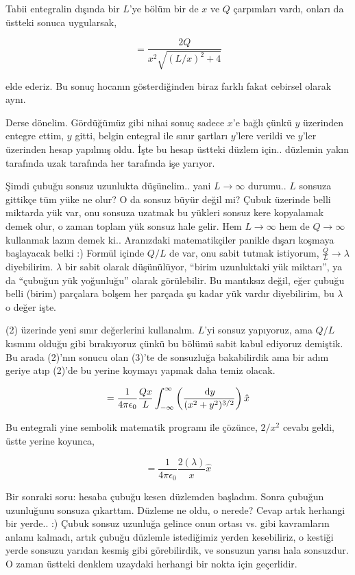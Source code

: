 \documentclass[12pt,fleqn]{article}\usepackage{../../common}
\begin{document}
Tabii entegralin dışında bir $L$'ye bölüm bir de $x$ ve $Q$ çarpımları
vardı, onları da üstteki sonuca uygularsak,

$$ 
= \frac{2 Q}{x^2 \sqrt{(L/x)^2 + 4}  }
$$

elde ederiz. Bu sonuç hocanın gösterdiğinden biraz farklı fakat cebirsel
olarak aynı. 

Derse dönelim. Gördüğümüz gibi nihai sonuç sadece $x$'e bağlı çünkü $y$
üzerinden entegre ettim, $y$ gitti, belgin entegral ile sınır şartları
$y$'lere verildi ve $y$'ler üzerinden hesap yapılmış oldu. İşte bu hesap
üstteki düzlem için.. düzlemin yakın tarafında uzak tarafında her tarafında
işe yarıyor.

Şimdi çubuğu sonsuz uzunlukta düşünelim.. yani $L \to \infty$ durumu.. $L$
sonsuza gittikçe tüm yüke ne olur? O da sonsuz büyür değil mi? Çubuk
üzerinde belli miktarda yük var, onu sonsuza uzatmak bu yükleri sonsuz kere
kopyalamak demek olur, o zaman toplam yük sonsuz hale gelir. Hem
$L \to \infty$ hem de $Q \to \infty$ kullanmak lazım demek ki..  Aranızdaki
matematikçiler panikle dışarı koşmaya başlayacak belki :) Formül
içinde $Q/L$ de var, onu sabit tutmak istiyorum, $\frac{Q}{L} \to \lambda$
diyebilirim. $\lambda$ bir sabit olarak düşünülüyor, ``birim uzunluktaki
yük miktarı'', ya da ``çubuğun yük yoğunluğu''  olarak görülebilir. Bu
mantıksız değil, eğer çubuğu belli (birim) parçalara bolşem her parçada şu
kadar yük vardır diyebilirim, bu $\lambda$ o değer işte. 

(2) üzerinde yeni sınır değerlerini kullanalım. $L$'yi sonsuz yapıyoruz,
ama $Q/L$ kısmını olduğu gibi bırakıyoruz çünkü bu bölümü sabit kabul
ediyoruz demiştik. Bu arada (2)'nın sonucu olan (3)'te de sonsuzluğa
bakabilirdik ama bir adım geriye atıp (2)'de bu yerine koymayı yapmak daha
temiz olacak.

$$ 
= \frac{1}{4\pi\epsilon_0} \frac{Q x}{L} 
\int_{-\infty}^{\infty} \left(\frac{\,\mathrm{d} y}{(x^2+y^2)^{3/2}} \right) \hat{x} 
$$

Bu entegrali yine sembolik matematik programı ile çözünce, $2/x^2$ cevabı
geldi, üstte yerine koyunca,

$$ 
= \frac{1}{4\pi\epsilon_0} \frac{2(\lambda)}{x} \hat{x}
$$

Bir sonraki soru: hesaba çubuğu kesen düzlemden başladım. Sonra çubuğun
uzunluğunu sonsuza çıkarttım. Düzleme ne oldu, o nerede? Cevap artık
herhangi bir yerde.. :) Çubuk sonsuz uzunluğa gelince onun ortası vs. gibi
kavramların anlamı kalmadı, artık çubuğu düzlemle istediğimiz yerden
kesebiliriz, o kestiği yerde sonsuzu yarıdan kesmiş gibi görebilirdik, ve
sonsuzun yarısı hala sonsuzdur. O zaman üstteki denklem uzaydaki herhangi
bir nokta için geçerlidir.
\end{document}
